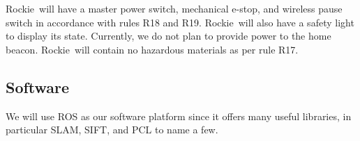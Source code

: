 \documentclass{paper}
\newcommand \robotName{Rockie} 		%
\begin{document}
	\robotName \ will have a master power switch, mechanical e-stop, and wireless pause switch in accordance with rules R18 and R19.  \robotName \ will also have a safety light to display its state.  Currently, we do not plan to provide power to the home beacon.  
	\robotName \ will contain no hazardous materials as per rule R17.  



\subsection*{Software}

	We will use ROS as our software platform since it offers many useful libraries, in particular SLAM, SIFT, and PCL to name a few.     
\end{document}
